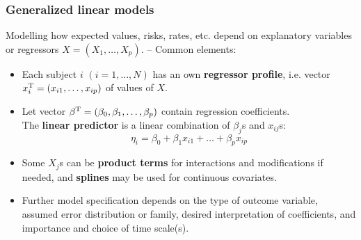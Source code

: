 \documentclass[12pt,dvipsnames,t,handout%
,aspectratio=169%
]{beamer}
\begin{document}
\begin{frame}
\frametitle{\large Generalized linear models}

Modelling how expected values, risks, rates, etc. depend on 
explanatory variables or regressors $X=(X_1, \dots, X_p)$. --
Common elements:
 \begin{itemize} 
 \item
Each subject $i$ $(i=1, \dots, N)$ has an own {\bf regressor profile}, 
i.e. 
vector $x_{i}^{\small\text{T}} = (x_{i1}, \dots, x_{ip})$ 
of values of $X$.   
\pause
\medskip
\item
 Let vector  
  $\beta^{\small\text{T}} = (\beta_0, \beta_1, \dots, \beta_p)$ 
  contain regression coefficients. \\ The \textbf{linear predictor} is
  a linear combination of $\beta_j$s and $x_{ij}$s:
 $$ \eta_i = \beta_0 + %
    \beta_1 x_{i1} + \dots + \beta_p x_{ip} $$ 
\item
Some $X_j$s can be {\bf product terms} for interactions and
modifications if needed, and 
{\bf splines} may be used for continuous covariates.
\medskip
\item
Further model specification depends on the type of outcome variable,
assumed error distribution or family,
desired interpretation of coefficients, 
and importance and choice of time scale(s).  
\end{itemize} 
\end{frame}
\end{document}
